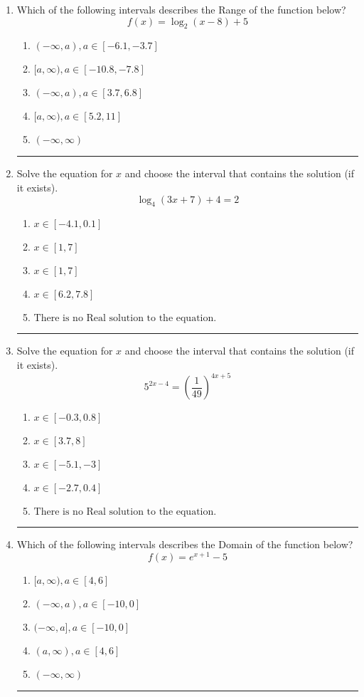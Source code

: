 \documentclass[14pt]{extbook}
\newcommand{\litem}[1]{\item#1\hspace*{-1cm}\rule{\textwidth}{0.4pt}}
\begin{document}
\begin{enumerate}
{\begin{enumerate}[label=\Alph*.]
\end{enumerate} }
\litem{
Which of the following intervals describes the Range of the function below?\[ f(x) = \log_2{(x-8)}+5 \]\begin{enumerate}[label=\Alph*.]
\item \( (-\infty, a), a \in [-6.1, -3.7] \)
\item \( [a, \infty), a \in [-10.8, -7.8] \)
\item \( (-\infty, a), a \in [3.7, 6.8] \)
\item \( [a, \infty), a \in [5.2, 11] \)
\item \( (-\infty, \infty) \)

\end{enumerate} }
\litem{
Solve the equation for $x$ and choose the interval that contains the solution (if it exists).\[ \log_{4}{(3x+7)}+4 = 2 \]\begin{enumerate}[label=\Alph*.]
\item \( x \in [-4.1, 0.1] \)
\item \( x \in [1, 7] \)
\item \( x \in [1, 7] \)
\item \( x \in [6.2, 7.8] \)
\item \( \text{There is no Real solution to the equation.} \)

\end{enumerate} }
\litem{
Solve the equation for $x$ and choose the interval that contains the solution (if it exists).\[ 5^{2x-4} = \left(\frac{1}{49}\right)^{4x+5} \]\begin{enumerate}[label=\Alph*.]
\item \( x \in [-0.3, 0.8] \)
\item \( x \in [3.7, 8] \)
\item \( x \in [-5.1, -3] \)
\item \( x \in [-2.7, 0.4] \)
\item \( \text{There is no Real solution to the equation.} \)

\end{enumerate} }
\litem{
Which of the following intervals describes the Domain of the function below?\[ f(x) = e^{x+1}-5 \]\begin{enumerate}[label=\Alph*.]
\item \( [a, \infty), a \in [4, 6] \)
\item \( (-\infty, a), a \in [-10, 0] \)
\item \( (-\infty, a], a \in [-10, 0] \)
\item \( (a, \infty), a \in [4, 6] \)
\item \( (-\infty, \infty) \)


\end{enumerate}}
\end{enumerate}
\end{document}
